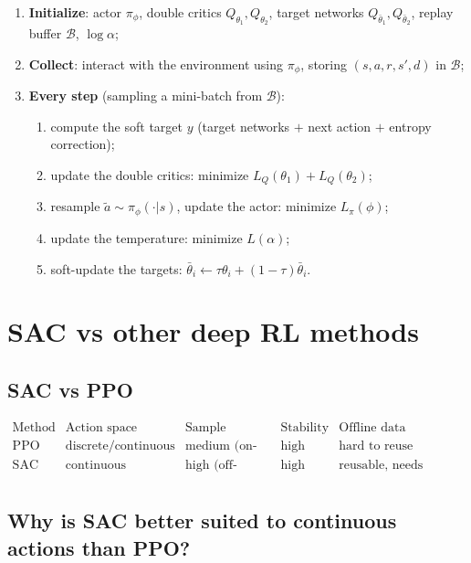 \documentclass{article}
\begin{document}
\begin{enumerate}
  \item \textbf{Initialize}: actor $\pi_\phi$, double critics $Q_{\theta_1}, Q_{\theta_2}$, target networks $Q_{\bar\theta_1}, Q_{\bar\theta_2}$, replay buffer $\mathcal{B}$, $\log\alpha$;
  \item \textbf{Collect}: interact with the environment using $\pi_\phi$, storing $(s,a,r,s',d)$ in $\mathcal{B}$;
  \item \textbf{Every step} (sampling a mini-batch from $\mathcal{B}$):
    \begin{enumerate}
      \item compute the soft target $y$ (target networks $+$ next action $+$ entropy correction);
      \item update the double critics: minimize $L_Q(\theta_1) + L_Q(\theta_2)$;
      \item resample $\tilde a\sim\pi_\phi(\cdot|s)$, update the actor: minimize $L_\pi(\phi)$;
      \item update the temperature: minimize $L(\alpha)$;
      \item soft-update the targets: $\bar\theta_i \leftarrow \tau\theta_i+(1-\tau)\bar\theta_i$.
    \end{enumerate}
\end{enumerate}

\section*{SAC vs other deep RL methods}

\subsection*{SAC vs PPO}

\[
\begin{array}{c|c|c|c|c}
\text{Method} & \text{Action space} & \text{Sample efficiency} & \text{Stability} & \text{Offline data} \\
\hline
\text{PPO} & \text{discrete/continuous} & \text{medium (on-policy)}  & \text{high} & \text{hard to reuse} \\
\text{SAC} & \text{continuous}     & \text{high (off-policy)} & \text{high} & \text{reusable, needs conservatism} \\
\end{array}
\]

\subsection*{Why is SAC better suited to continuous actions than PPO?}
\end{document}
